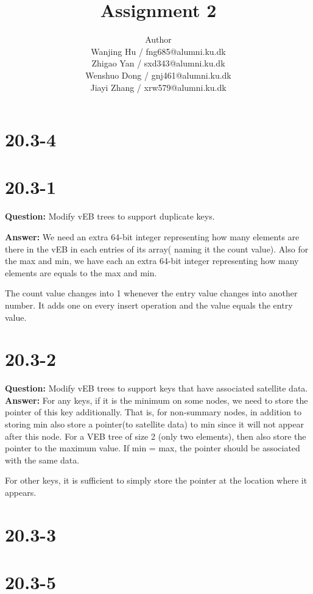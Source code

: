 \documentclass[12pt]{article}
\title{Assignment 2}
\author{Author \\
  Wanjing Hu / fng685@alumni.ku.dk  \\
  Zhigao Yan / sxd343@alumni.ku.dk  \\
  Wenshuo Dong / gnj461@alumni.ku.dk  \\
  Jiayi Zhang / xrw579@alumni.ku.dk \\
}
\begin{document}
\maketitle

\section{20.3-4}

\section{20.3-1}
\textbf{Question: } 
Modify vEB trees to support duplicate keys.

\textbf{Answer:}
We need an extra 64-bit integer representing how many elements are there in the vEB in each entries of its array( naming it the count value). Also for the max and min, we have each an extra  64-bit integer representing how many elements are equals to the max and min. 

The count value changes into 1 whenever the entry value changes into another number. It adds one on every insert operation and the value equals the entry value.

\section{20.3-2}
\textbf{Question:} Modify vEB trees to support keys that have associated satellite data.\\
\textbf{Answer:} For any keys, if it is the minimum on some nodes, we need to store the pointer of this key additionally. That is, for non-summary nodes, in addition to storing min also store a pointer(to satellite data) to min since it will not appear after this node.
For a VEB tree of size 2 (only two elements), then also store the pointer to the maximum value. If min = max, the pointer should be associated with the same data. 


For other keys, it is sufficient to simply store the pointer at the location where it appears.
\section{20.3-3}

\section{20.3-5}
\end{document}
